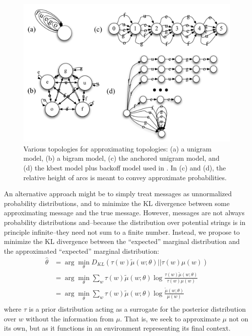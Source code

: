 \documentclass[11pt,a4paper]{article}
\begin{document}
\begin{figure}
  \centering
  \includegraphics[scale=0.4]{fsa}
  \caption{Various topologies for approximating topologies: (a) a
  unigram model, (b) a bigram model, (c) the anchored unigram model,
  and (d) the kbest model plus backoff model used in
  . In (c) and (d), the relative height
  of arcs is meant to convey approximate probabilities.}
  \label{fig:fsa}
\end{figure}


An alternative approach might be to simply treat messages as
unnormalized probability distributions, and to minimize the KL
divergence between some approximating message and the true message.
However, messages are not always probability distributions and--because
the distribution over potential strings is in principle infinite--they
need not sum to a finite number. Instead, we propose to minimize
the KL divergence between the ``expected'' marginal distribution
and the approximated ``expected'' marginal distribution:
\begin{equation}
  \begin{split}
    \hat\theta &= \arg\!\min_{\theta} D_{KL}(\tau(w)\tilde\mu(w;\theta)||\tau(w)\mu(w) ) \\
    &= \arg\!\min_{\theta} \sum_w \tau(w) \tilde\mu(w;\theta) \log \frac{\tau(w)\tilde\mu(w;\theta)}{\tau(w)\mu(w)} \\
    &= \arg\!\min_{\theta} \sum_w \tau(w) \tilde\mu(w;\theta) \log \frac{\tilde\mu(w;\theta)}{\mu(w)} \\
   \end{split}
 \end{equation}
where $\tau$ is a prior distribution acting as a surrogate for the
posterior distribution over $w$ without the information from $\mu$.
That is, we seek to approximate $\mu$ not on its own, but as it
functions in an environment representing its final context.
\end{document}
